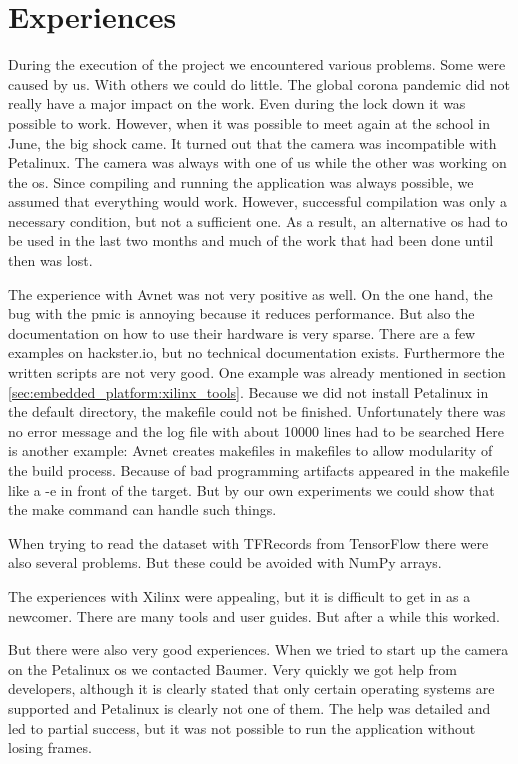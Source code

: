 \chapter*{Experiences}
\label{ch:experiences}

During the execution of the project we encountered various problems.
Some were caused by us.
With others we could do little.
The global corona pandemic did not really have a major impact on the work.
Even during the lock down it was possible to work.
However, when it was possible to meet again at the school in June, the big shock came.
It turned out that the camera was incompatible with Petalinux.
The camera was always with one of us while the other was working on the \acrlong{os}.
Since compiling and running the application was always possible, we assumed that everything would work.
However, successful compilation was only a necessary condition, but not a sufficient one.
As a result, an alternative \acrlong{os} had to be used in the last two months and much of the work that had been done until then was lost. 

The experience with Avnet was not very positive as well.
On the one hand, the bug with the \acrshort{pmic} is annoying because it reduces performance.
But also the documentation on how to use their hardware is very sparse.
There are a few examples on hackster.io, but no technical documentation exists.
Furthermore the written scripts are not very good.
One example was already mentioned in section \ref{sec:embedded_platform:xilinx_tools}.
Because we did not install Petalinux in the default directory, the makefile could not be finished.
Unfortunately there was no error message and the log file with about \num{10000} lines had to be searched
Here is another example:
Avnet creates makefiles in makefiles to allow modularity of the build process.
Because of bad programming artifacts appeared in the makefile like a -e in front of the target.
But by our own experiments we could show that the make command can handle such things.

When trying to read the dataset with TFRecords from TensorFlow there were also several problems.
But these could be avoided with NumPy arrays.

The experiences with Xilinx were appealing, but it is difficult to get in as a newcomer.
There are many tools and user guides.
But after a while this worked.

But there were also very good experiences.
When we tried to start up the camera on the Petalinux \acrshort{os} we contacted Baumer.
Very quickly we got help from developers, although it is clearly stated that only certain operating systems are supported and Petalinux is clearly not one of them.
The help was detailed and led to partial success, but it was not possible to run the application without losing frames.

